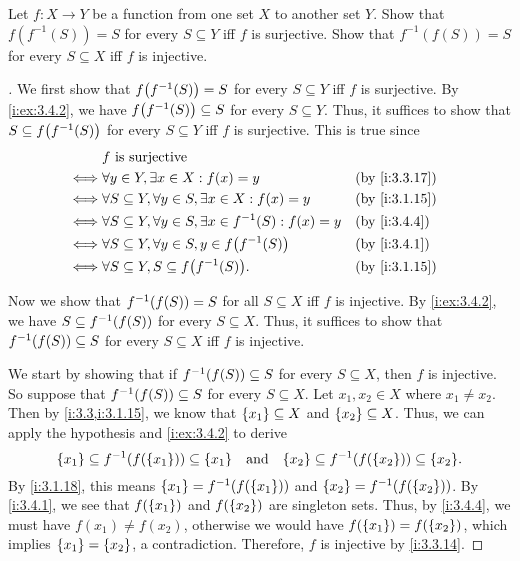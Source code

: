 \begin{ex}\label{i:ex:3.4.5}
  Let \(f : X \to Y\) be a function from one set \(X\) to another set \(Y\).
  Show that \(f(f^{-1}(S)) = S\) for every \(S \subseteq Y\) iff \(f\) is surjective.
  Show that \(f^{-1}(f(S)) = S\) for every \(S \subseteq X\) iff \(f\) is injective.
\end{ex}

\begin{proof}[]
  We first show that \(f\pa{f^{-1}(S)} = S\) for every \(S \subseteq Y\) iff \(f\) is surjective.
  By \cref{i:ex:3.4.2}, we have \(f\pa{f^{-1}(S)} \subseteq S\) for every \(S \subseteq Y\).
  Thus, it suffices to show that \(S \subseteq f\pa{f^{-1}(S)}\) for every \(S \subseteq Y\) iff \(f\) is surjective.
  This is true since
  \begin{align*}
         & f \text{ is surjective}                                                                       \\
    \iff & \forall y \in Y, \exists x \in X : f(x) = y                                &  & \by{i:3.3.17} \\
    \iff & \forall S \subseteq Y, \forall y \in S, \exists x \in X : f(x) = y         &  & \by{i:3.1.15} \\
    \iff & \forall S \subseteq Y, \forall y \in S, \exists x \in f^{-1}(S) : f(x) = y &  & \by{i:3.4.4}  \\
    \iff & \forall S \subseteq Y, \forall y \in S, y \in f\pa{f^{-1}(S)}              &  & \by{i:3.4.1}  \\
    \iff & \forall S \subseteq Y, S \subseteq f\pa{f^{-1}(S)}.                        &  & \by{i:3.1.15}
  \end{align*}

  Now we show that \(f^{-1}\pa{f(S)} = S\) for all \(S \subseteq X\) iff \(f\) is injective.
  By \cref{i:ex:3.4.2}, we have \(S \subseteq f^{-1}\pa{f(S)}\) for every \(S \subseteq X\).
  Thus, it suffices to show that \(f^{-1}\pa{f(S)} \subseteq S\) for every \(S \subseteq X\) iff \(f\) is injective.

  We start by showing that if \(f^{-1}\pa{f(S)} \subseteq S\) for every \(S \subseteq X\), then \(f\) is injective.
  So suppose that \(f^{-1}\pa{f(S)} \subseteq S\) for every \(S \subseteq X\).
  Let \(x_1, x_2 \in X\) where \(x_1 \neq x_2\).
  Then by \cref{i:3.3,i:3.1.15}, we know that \(\left\lbrace x_1\right\rbrace \subseteq X\) and \(\left\lbrace x_2\right\rbrace \subseteq X\).
  Thus, we can apply the hypothesis and \cref{i:ex:3.4.2} to derive
  \[
    \set{x_1} \subseteq f^{-1}\pa{f\pa{\set{x_1}}} \subseteq \set{x_1} \quad \text{and} \quad \set{x_2} \subseteq f^{-1}\pa{f\pa{\set{x_2}}} \subseteq \set{x_2}.
  \]
  By \cref{i:3.1.18}, this means \(\set{x_1} = f^{-1}\pa{f\pa{\set{x_1}}}\) and \(\set{x_2} = f^{-1}\pa{f\pa{\set{x_2}}}\).
  By \cref{i:3.4.1}, we see that \(f\pa{\set{x_1}}\) and \(f\pa{\set{x_2}}\) are singleton sets.
  Thus, by \cref{i:3.4.4}, we must have \(f(x_1) \neq f(x_2)\), otherwise we would have \(f(\left\lbrace x_1\right\rbrace) = f(\left\lbrace x_2\right\rbrace)\), which implies \(\left\lbrace x_1\right\rbrace = \left\lbrace x_2\right\rbrace\), a contradiction.
  Therefore, \(f\) is injective by \cref{i:3.3.14}.


\end{proof}
